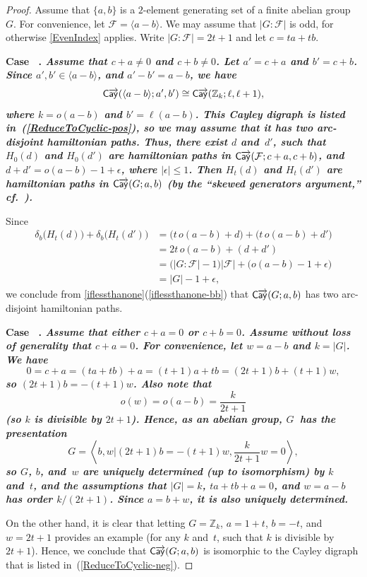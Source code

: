 \documentclass[11pt]{amsart}
\newcommand{\fullcref}[2]{\cref{#1}(\ref{#1-#2})}
\theoremstyle{definition}
\newcounter{case}
\newcounter{startcases}
\numberwithin{case}{startcases}
\newenvironment{case}[1][\unskip]{\refstepcounter{case}\bf
	\medskip \noindent Case \thecase\ #1. \it}{\unskip\upshape}
\renewcommand{\thecase}{\Roman{case}}
\numberwithin{equation}{section}
\newcommand{\Z}{\mathbb{Z}}  %
\newcommand{\cayd}{\mathop{\mathsf{C}\mkern-1mu\overrightarrow{\mathsf{ay}}}}
\begin{document}
	\begin{proof}
		Assume that $\{a,b\}$ is a $2$-element generating set of a finite abelian group~$G$. For convenience, let $\mathcal F = \langle a - b \rangle$. We may assume that $|G : \mathcal F|$ is odd, for otherwise \cref{EvenIndex} applies. Write $|G : \mathcal F| = 2t + 1$ and let $c = ta + tb$. 
		
		\begin{case}
			Assume that $c + a \neq 0$ and $c + b \neq 0$.
		\end{case}
		Let $a' = c + a$ and $b' = c + b$. Since $a',b' \in \langle a - b \rangle$, and $a' - b' = a - b$, we have 
		\[ \cayd( \langle a - b \rangle; a', b') \cong \cayd(\Z_k; \ell, \ell + 1) , \]
		where $k = o(a - b)$ and $b' = \ell(a - b)$. This Cayley digraph is listed in~(\ref{ReduceToCyclic-pos}), so we may assume that it has two arc-disjoint hamiltonian paths. 
		Thus, there exist $d$ and~$d'$, such that $H_0(d)$ and $H_0(d')$ are hamiltonian paths in $\cayd( \mathcal F; c + a, c + b)$, and $d + d' = o(a - b) - 1 + \epsilon$, where $|\epsilon| \le 1$. Then $H_t(d)$ and $H_t(d')$ are hamiltonian paths in $\cayd(G; a,b)$ (by the ``skewed generators argument\rlap,'' cf.\ \cite[Lem.~11]{morris2012nilp}). 
		
		Since 
		\begin{align*}
			\delta_b \bigl( H_t(d) \bigr) + \delta_b \bigl( H_t(d') \bigr)
			&= \bigl( t \, o(a - b) + d \bigr) + \bigl( t \, o(a - b) + d' \bigr)
			\\&= 2t \, o(a - b) + (d + d')
			\\&= \bigl( |G : \mathcal F| - 1 \bigr) |\mathcal F| + \bigl( o(a - b) - 1 + \epsilon \bigr)
			\\&= |G| - 1 + \epsilon
			, \end{align*}
		we conclude from \fullcref{iflessthanone}{bb} that $\cayd(G; a,b)$ has two arc-disjoint hamiltonian paths.
		
		\begin{case}
			Assume that either $c + a = 0$ or $c + b = 0$.
		\end{case}
		Assume without loss of generality that $c + a = 0$.
		For convenience, let $w = a - b$ and $k = |G|$. We have
		\[ 0 = c + a = (ta + tb) + a = (t+1)a + tb = (2t+1)b + (t+1)w , \]
		so $(2t + 1)b = -(t + 1)w$. Also note that 
		\[ o(w) = o(a - b) = \frac{k}{2t + 1} \]
		(so $k$ is divisible by $2t + 1$). Hence, as an abelian group, $G$~has the presentation
		\[ G = \left\langle b, w \mathrel{\Big|} (2t + 1)b = -(t + 1)w, \frac{k}{2t+1} w = 0 \right\rangle , \]
		so $G$, $b$, and~$w$ are uniquely determined (up to isomorphism) by $k$ and~$t$, and the assumptions that $|G| = k$, $ta + tb + a = 0$, and $w = a - b$ has order $k/(2t+1)$. Since $a = b + w$, it is also uniquely determined.
		
		On the other hand, it is clear that letting $G = \Z_k$, $a = 1 + t$, $b = -t$, and $w = 2t + 1$ provides an example (for any $k$ and~$t$, such that $k$ is divisible by $2t + 1$). Hence, we conclude that $\cayd(G; a,b)$ is isomorphic to the Cayley digraph that is listed in~(\ref{ReduceToCyclic-neg}).
	\end{proof}
	
\end{document}
